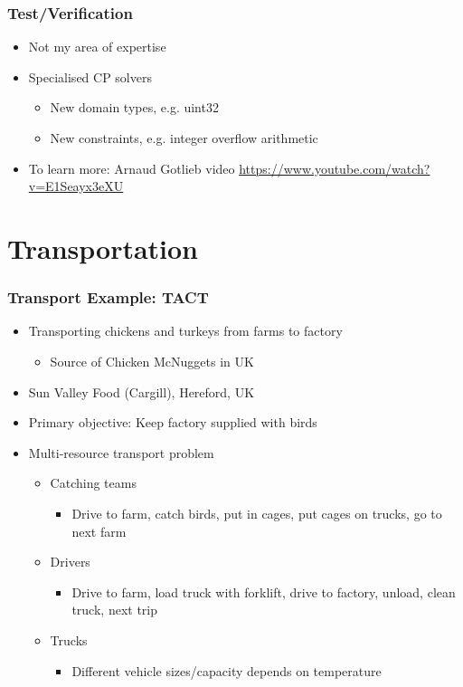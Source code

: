 \begin{frame}
\frametitle{Test/Verification}
\begin{itemize}
\item Not my area of expertise
\item Specialised CP solvers
\begin{itemize}
\item New domain types, e.g. uint32
\item New constraints, e.g. integer overflow arithmetic
\end{itemize}
\item To learn more: Arnaud Gotlieb video \url{https://www.youtube.com/watch?v=E1Seayx3eXU}
\end{itemize}
\end{frame}

\section{Transportation}

\begin{frame}
\frametitle{Transport Example: TACT}
\begin{itemize}
\item Transporting chickens and turkeys from farms to factory
\begin{itemize}
\item Source of Chicken McNuggets in UK
\end{itemize}
\item Sun Valley Food (Cargill), Hereford, UK
\item Primary objective: Keep factory supplied with birds
\item Multi-resource transport problem
\begin{itemize}
\item Catching teams
\begin{itemize}
\item Drive to farm, catch birds, put in cages, put cages on trucks, go to next farm
\end{itemize}
\item Drivers
\begin{itemize}
\item Drive to farm, load truck with forklift, drive to factory, unload, clean truck, next trip
\end{itemize}
\item Trucks
\begin{itemize}
\item Different vehicle sizes/capacity depends on temperature
\end{itemize}
\end{itemize}

\end{itemize}
\end{frame}

